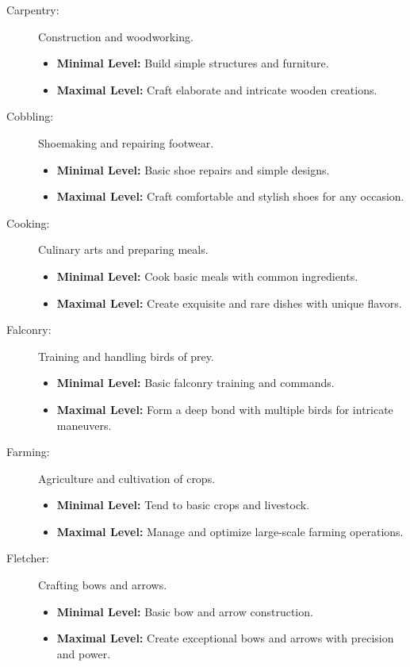 \documentclass[12pt]{book}
\begin{document}
\begin{description}
    \item[Carpentry:] Construction and woodworking.
        \begin{itemize}
            \item \textbf{Minimal Level:} Build simple structures and furniture.
            \item \textbf{Maximal Level:} Craft elaborate and intricate wooden creations.
        \end{itemize}

    \item[Cobbling:] Shoemaking and repairing footwear.
        \begin{itemize}
            \item \textbf{Minimal Level:} Basic shoe repairs and simple designs.
            \item \textbf{Maximal Level:} Craft comfortable and stylish shoes for any occasion.
        \end{itemize}

    \item[Cooking:] Culinary arts and preparing meals.
        \begin{itemize}
            \item \textbf{Minimal Level:} Cook basic meals with common ingredients.
            \item \textbf{Maximal Level:} Create exquisite and rare dishes with unique flavors.
        \end{itemize}

    \item[Falconry:] Training and handling birds of prey.
        \begin{itemize}
            \item \textbf{Minimal Level:} Basic falconry training and commands.
            \item \textbf{Maximal Level:} Form a deep bond with multiple birds for intricate maneuvers.
        \end{itemize}

    \item[Farming:] Agriculture and cultivation of crops.
        \begin{itemize}
            \item \textbf{Minimal Level:} Tend to basic crops and livestock.
            \item \textbf{Maximal Level:} Manage and optimize large-scale farming operations.
        \end{itemize}

    \item[Fletcher:] Crafting bows and arrows.
        \begin{itemize}
            \item \textbf{Minimal Level:} Basic bow and arrow construction.
            \item \textbf{Maximal Level:} Create exceptional bows and arrows with precision and power.
        \end{itemize}


\end{description}
\end{document}
